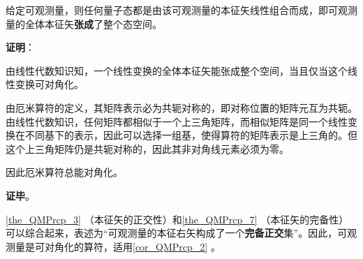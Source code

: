 \begin{theorem}{}\label{the_QMPrcp_7}
给定可观测量，则任何量子态都是由该可观测量的本征矢线性组合而成，即可观测量的全体本征矢\textbf{张成}了整个态空间。
\end{theorem}

\textbf{证明}：

由线性代数知识知，一个线性变换的全体本征矢能张成整个空间，当且仅当这个线性变换可对角化。

由厄米算符的定义，其矩阵表示必为共轭对称的，即对称位置的矩阵元互为共轭。由线性代数知识，任何矩阵都相似于一个上三角矩阵，而相似矩阵是同一个线性变换在不同基下的表示，因此可以选择一组基，使得算符的矩阵表示是上三角的。但这个上三角矩阵仍是共轭对称的，因此其非对角线元素必须为零。

因此厄米算符总能对角化。

\textbf{证毕}。

\autoref{the_QMPrcp_3} （本征矢的正交性）和\autoref{the_QMPrcp_7} （本征矢的完备性）可以综合起来，表述为“可观测量的本征右矢构成了一个\textbf{完备正交}集”。因此，可观测量是可对角化的算符，适用\autoref{cor_QMPrcp_2} 。


